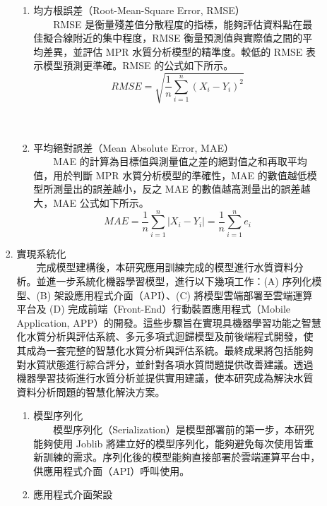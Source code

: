 \documentclass[12pt,a4paper]{article}
\begin{document}
\begin{enumerate}
\begin{enumerate}[label=\arabic*.]
\begin{enumerate}[label=2-2-\arabic*.]
\begin{enumerate}[label=\Alph*.]
                \item 均方根誤差（Root-Mean-Square Error, RMSE）\\
                　　RMSE 是衡量殘差值分散程度的指標，能夠評估資料點在最佳擬合線附近的集中程度，RMSE 衡量預測值與實際值之間的平均差異，並評估 MPR 水質分析模型的精準度。較低的 RMSE 表示模型預測更準確。RMSE 的公式如下所示。
                    \begin{equation}
                    RMSE = \sqrt{\frac{1}{n} \sum_{i=1}^n (X_i - Y_i)^2}
                    \end{equation}
                \\
                \\
                \item 平均絕對誤差（Mean Absolute Error, MAE）\\
                　　MAE 的計算為目標值與測量值之差的絕對值之和再取平均值，用於判斷 MPR 水質分析模型的準確性，MAE 的數值越低模型所測量出的誤差越小，反之 MAE 的數值越高測量出的誤差越大，MAE 公式如下所示。
                    \begin{equation}
                    MAE = \frac{1}{n} \sum_{i=1}^n |X_i - Y_i| = \frac{1}{n} \sum_{i=1}^n e_i
                    \end{equation}
            \end{enumerate}
        \item 實現系統化\\
        　　完成模型建構後，本研究應用訓練完成的模型進行水質資料分析。並進一步系統化機器學習模型，進行以下幾項工作：(A) 序列化模型、(B) 架設應用程式介面（API）、(C) 將模型雲端部署至雲端運算平台及 (D) 完成前端（Front-End）行動裝置應用程式（Mobile Application, APP）的開發。這些步驟旨在實現具機器學習功能之智慧化水質分析與評估系統、多元多項式迴歸模型及前後端程式開發，使其成為一套完整的智慧化水質分析與評估系統。最終成果將包括能夠對水質狀態進行綜合評分，並針對各項水質問題提供改善建議。透過機器學習技術進行水質分析並提供實用建議，使本研究成為解決水質資料分析問題的智慧化解決方案。
            \begin{enumerate}[label=\Alph*.]
                \item 模型序列化\\
                　　模型序列化（Serialization）是模型部署前的第一步，本研究能夠使用 Joblib 將建立好的模型序列化，能夠避免每次使用皆重新訓練的需求。序列化後的模型能夠直接部署於雲端運算平台中，供應用程式介面（API）呼叫使用。
                \item 應用程式介面架設\\

\end{enumerate}
\end{enumerate}
\end{enumerate}
\end{enumerate}
\end{document}
